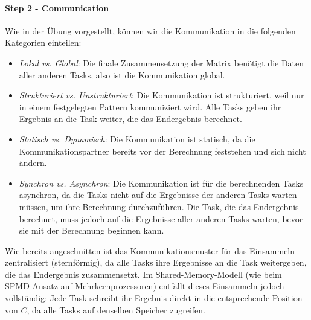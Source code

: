 \paragraph{Step 2 - Communication} Wie in der Übung vorgestellt, können wir die Kommunikation in die folgenden Kategorien einteilen:
\begin{itemize}
    \item \textit{Lokal vs. Global}: Die finale Zusammensetzung der Matrix benötigt die Daten aller anderen Tasks, also ist die Kommunikation global.
    \item \textit{Strukturiert vs. Unstrukturiert}: Die Kommunikation ist strukturiert, weil nur in einem festgelegten Pattern kommuniziert wird. 
        Alle Tasks geben ihr Ergebnis an die Task weiter, die das Endergebnis berechnet. 
    \item \textit{Statisch vs. Dynamisch}: Die Kommunikation ist statisch, da die Kommunikationspartner bereits vor der Berechnung feststehen und sich nicht ändern.
        \item \textit{Synchron vs. Asynchron}: Die Kommunikation ist für die berechnenden Tasks asynchron, 
            da die Tasks nicht auf die Ergebnisse der anderen Tasks warten müssen, um ihre Berechnung durchzuführen. 
            Die Task, die das Endergebnis berechnet, muss jedoch auf die Ergebnisse aller anderen Tasks warten, 
            bevor sie mit der Berechnung beginnen kann.
\end{itemize}

Wie bereits angeschnitten ist das Kommunikationsmuster für das Einsammeln zentralisiert (sternförmig), da alle Tasks ihre Ergebnisse an die Task weitergeben, die das Endergebnis zusammensetzt. Im Shared-Memory-Modell (wie beim SPMD-Ansatz auf Mehrkernprozessoren) entfällt dieses Einsammeln jedoch vollständig: Jede Task schreibt ihr Ergebnis direkt in die entsprechende Position von $C$, da alle Tasks auf denselben Speicher zugreifen.


